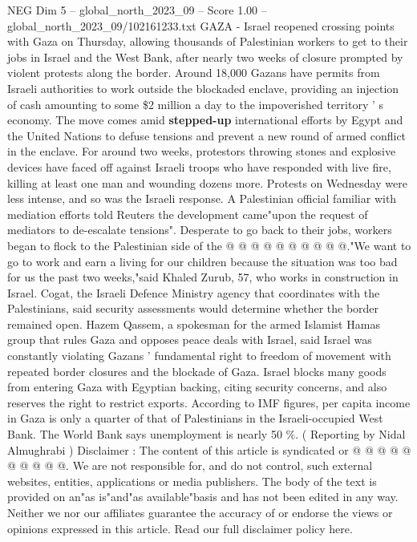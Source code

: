 \begin{textsample}{NEG Dim 5 – global\_north\_2023\_09 – Score 1.00 – global\_north\_2023\_09/102161233.txt}  \label{ex:f5_neg_015}
GAZA - Israel reopened crossing points with Gaza on Thursday, allowing thousands of Palestinian workers to get to their jobs in Israel and the West Bank, after nearly two weeks of closure prompted by violent protests along the border.
Around 18,000 Gazans have permits from Israeli authorities to work outside the blockaded enclave, providing an injection of cash amounting to some \$2 million a day to the impoverished territory ' s economy.
The move comes amid \textbf{stepped-up} international efforts by Egypt and the United Nations to defuse tensions and prevent a new round of armed conflict in the enclave.
For around two weeks, protestors throwing stones and explosive devices have faced off against Israeli troops who have responded with live fire, killing at least one man and wounding dozens more.
Protests on Wednesday were less intense, and so was the Israeli response.
A Palestinian official familiar with mediation efforts told Reuters the development came"upon the request of mediators to de-escalate tensions".
Desperate to go back to their jobs, workers began to flock to the Palestinian side of the @ @ @ @ @ @ @ @ @ @."We want to go to work and earn a living for our children because the situation was too bad for us the past two weeks,"said Khaled Zurub, 57, who works in construction in Israel.
Cogat, the Israeli Defence Ministry agency that coordinates with the Palestinians, said security assessments would determine whether the border remained open.
Hazem Qassem, a spokesman for the armed Islamist Hamas group that rules Gaza and opposes peace deals with Israel, said Israel was constantly violating Gazans ' fundamental right to freedom of movement with repeated border closures and the blockade of Gaza.
Israel blocks many goods from entering Gaza with Egyptian backing, citing security concerns, and also reserves the right to restrict exports.
According to IMF figures, per capita income in Gaza is only a quarter of that of Palestinians in the Israeli-occupied West Bank.
The World Bank says unemployment is nearly 50 \%. ( Reporting by Nidal Almughrabi ) Disclaimer : The content of this article is syndicated or @ @ @ @ @ @ @ @ @ @.
We are not responsible for, and do not control, such external websites, entities, applications or media publishers.
The body of the text is provided on an"as is"and"as available"basis and has not been edited in any way.
Neither we nor our affiliates guarantee the accuracy of or endorse the views or opinions expressed in this article.
Read our full disclaimer policy here.

\end{textsample}
